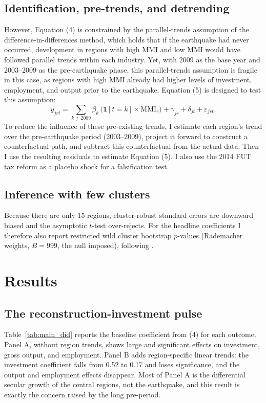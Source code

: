 \documentclass[12pt]{article}
\begin{document}
\subsection{Identification, pre-trends, and detrending}
However, Equation (4) is constrained by the parallel-trends assumption of the difference-in-differences
method, which holds that if the earthquake had never occurred, development in regions with high MMI and
low MMI would have followed parallel trends within each industry. Yet, with 2009 as the base year and
2003--2009 as the pre-earthquake phase, this parallel-trends assumption is fragile in this case, as
regions with high MMI already had higher levels of investment, employment, and output prior to the
earthquake. Equation (5) is designed to test this assumption:
\begin{equation}
y_{jrt} = \sum_{k\neq 2009} \beta_k\,\big(\mathbf{1}[t=k] \times \text{MMI}_r\big) + \gamma_{jr} + \delta_{jt} + \varepsilon_{jrt}.
\end{equation}
To reduce the influence of these pre-existing trends, I estimate each region's trend over the
pre-earthquake period (2003--2009), project it forward to construct a counterfactual path, and subtract
this counterfactual from the actual data. Then I use the resulting residuals to estimate Equation (5).
I also use the 2014 FUT tax reform as a placebo shock for a falsification test.

\subsection{Inference with few clusters}
Because there are only 15 regions, cluster-robust standard errors are downward biased and the asymptotic
$t$-test over-rejects. For the headline coefficients I therefore also report restricted wild cluster
bootstrap $p$-values (Rademacher weights, $B = 999$, the null imposed), following \citet{cameron2008}.

\FloatBarrier
\section{Results}\label{sec:results}

\subsection{The reconstruction-investment pulse}
Table~\ref{tab:main_did} reports the baseline coefficient from (4) for each outcome. Panel A, without
region trends, shows large and significant effects on investment, gross output, and employment. Panel
B adds region-specific linear trends: the investment coefficient falls from 0.52 to 0.17 and loses
significance, and the output and employment effects disappear. Most of Panel A is the differential
secular growth of the central regions, not the earthquake, and this result is exactly the concern
raised by the long pre-period.
\end{document}
